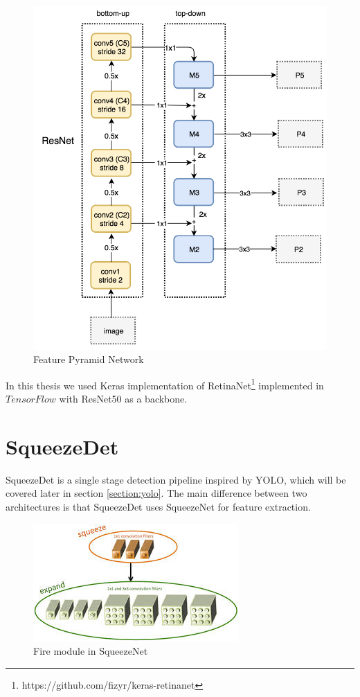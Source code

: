 \documentclass[twoside]{ctuthesis}
\theoremstyle{plain}
\theoremstyle{definition}
\theoremstyle{note}
\begin{document}
\begin{figure}[h]
\caption{Feature Pyramid Network}
\label{fpn}
\includegraphics[width=\textwidth]{images/used_networks/fpn.png}
\end{figure}
In this thesis we used Keras implementation of RetinaNet\footnote{https://github.com/fizyr/keras-retinanet} implemented in $TensorFlow$ with ResNet50 as a backbone. 
\section{SqueezeDet}
SqueezeDet\cite{wu_iandola_jin_keutzer_2017} is a single stage detection pipeline inspired by YOLO, which will be covered later in section \ref{section:yolo}. The main difference between two architectures is that SqueezeDet uses SqueezeNet\cite{squeezenet} for feature extraction.

\begin{figure}[H]
\caption{Fire module in SqueezeNet\cite{squeezenet}}
\label{fire_squeezenet}
\includegraphics[width=.5\textwidth]{images/used_networks/fire_squeezenet.jpeg}
\end{figure}
\end{document}
